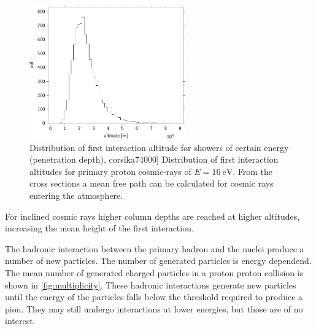 \begin{figure}
    \centering
    \includegraphics[width=0.6\textwidth]
                    {plots/cosmic-rays/first_interaction_altitude}
    \caption{Distribution of first interaction altitude for showers of certain energy (penetration depth), corsika74000]
Distribution of first interaction altitudes for primary proton cosmic-rays of $E = \SI{16}{\eV}$. From the cross sections a mean free path can be calculated for cosmic rays entering the atmosphere.}
    \label{fig:first_interaction_altitude}
\end{figure}

For inclined cosmic rays higher column depths are reached at higher altitudes, increasing the mean height of the first interaction.


The hadronic interaction between the primary hadron and the nuclei produce a number of new particles. The number of generated particles is energy dependend. The mean number of generated charged particles in a proton proton collision is shown in \cref{fig:multiplicity}. These hadronic interactions generate new particles until the energy of the particles falls below the threshold required to produce a pion. They may still undergo interactions at lower energies, but those are of no interest.

